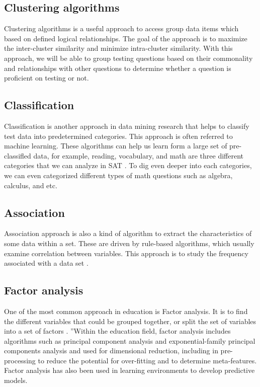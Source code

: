 \documentclass[sigconf]{acmart}
\begin{document}
\subsection{Clustering algorithms}
Clustering algorithms is a useful approach to access group data items which based on  defined logical relationships\cite {Daniel2015}. The goal of the approach is to maximize the inter-cluster similarity and minimize intra-cluster similarity. With this approach, we will be able to group testing questions based on their commonality and relationships with other questions to determine whether a question is proficient on testing or not.

\subsection{Classification}
Classification is another approach in data mining research that helps to classify test data into predetermined categories. This approach is often referred to machine learning. These algorithms can help us learn form a large set of pre-classifled data, for example, reading, vocabulary, and math are three different categories that we can analyze in SAT \cite {Daniel2015}. To dig even deeper into each categories, we can even categorized different types of math questions such as algebra, calculus, and etc. 

\subsection{Association}
Association approach is also a kind of algorithm to extract the characteristics of some data within a set. These are driven by rule-based algorithms, which usually examine correlation between variables. This approach is to study the frequency associated with a data set \cite {Daniel2015}.

\subsection{Factor analysis}
One of the most common approach in education is Factor analysis. It is to find the different variables that could be grouped together, or split the set of variables into a set of factors \cite {Daniel2015}. ''Within the education field, factor analysis includes algorithms such as principal component analysis and exponential-family principal components analysis and used for dimensional reduction, including in pre-processing to reduce the potential for over-fitting and to determine meta-features. Factor analysis has also been used in learning environments to develop predictive models.
\end{document}
